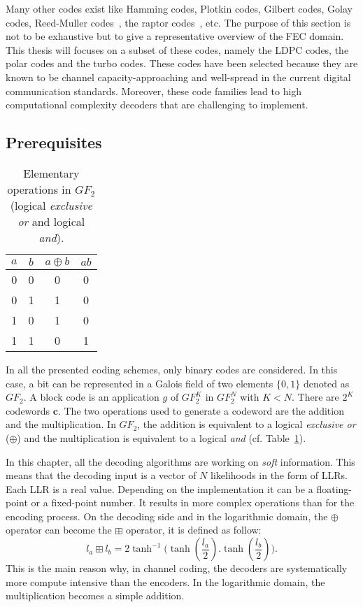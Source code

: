 Many other codes exist like Hamming codes, Plotkin codes, Gilbert codes, Golay
codes, Reed-Muller codes~\cite{Muller1954,Reed1954}, the raptor
codes~\cite{Shokrollahi2004}, etc. The purpose of this section is not to be
exhaustive but to give a representative overview of the FEC domain. This thesis
will focuses on a subset of these codes, namely the LDPC codes, the polar codes
and the turbo codes. These codes have been selected because they are known to
be channel capacity-approaching and well-spread in the current digital
communication standards. Moreover, these code families lead to high
computational complexity decoders that are challenging to implement.

\subsection{Prerequisites}

\begin{table}[htp]
  \centering
  \caption{Elementary operations in $GF_2$ (logical \emph{exclusive or} and
    logical \emph{and}).}
  \label{tab:ctx_gf2_operations}
   \begin{tabular}{c c c c}
   $a$ & $b$ & $a \oplus b$ & $ab$ \\
    \hline
    \hline
    0 & 0 & 0 & 0 \\
    0 & 1 & 1 & 0 \\
    1 & 0 & 1 & 0 \\
    1 & 1 & 0 & 1 \\
  \end{tabular}
\end{table}

In all the presented coding schemes, only binary codes are considered. In this
case, a bit can be represented in a Galois field of two elements $\{0, 1\}$
denoted as $GF_2$. A block code is an application $g$ of $GF_2^K$ in $GF_2^N$
with $K < N$. There are $2^K$ codewords $\bm{c}$. The two operations used to
generate a codeword are the addition and the multiplication. In $GF_2$, the
addition is equivalent to a logical \emph{exclusive or} ($\oplus$) and
the multiplication is equivalent to a logical \emph{and} (cf.
Table~\ref{tab:ctx_gf2_operations}).

In this chapter, all the decoding algorithms are working on \emph{soft}
information. This means that the decoding input is a vector of $N$ likelihoods
in the form of LLRs. Each LLR is a real value. Depending on the implementation
it can be a floating-point or a fixed-point number. It results in more complex
operations than for the encoding process. On the decoding side and in the
logarithmic domain, the $\oplus$ operator can become the $\boxplus$ operator, it
is defined as follow:
\begin{equation}
  l_a \boxplus l_b = 2\tanh^{-1}{\big(\tanh{(\frac{l_a}{2}).\tanh{(\frac{l_b}{2})}}\big)}.
\end{equation}
This is the main reason why, in channel coding, the decoders are systematically
more compute intensive than the encoders. In the logarithmic domain, the
multiplication becomes a simple addition.

